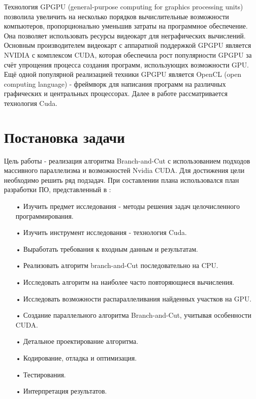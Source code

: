 \documentclass[a4paper,14pt,russian]{extreport}
\begin{document}
\par Технология GPGPU (general-purpose computing for graphics processing units) позволила увеличить на несколько порядков вычислительные возможности компьютеров, пропорционально уменьшив затраты на программное обеспечение. Она позволяет использовать ресурсы видеокарт для неграфических вычислений. Основным производителем видеокарт с аппаратной поддержкой GPGPU является NVIDIA с комплексом CUDA, которая обеспечила рост популярности GPGPU за счёт упрощения процесса создания программ, использующих возможности GPU. Ещё одной популярной реализацией техники GPGPU является OpenCL (open computing language) - фреймворк для написания программ на различных графических и центральных процессорах. Далее в работе рассматривается технология Cuda.


\section{Постановка задачи}

Цель работы - реализация алгоритма Branch-and-Cut с использованием подходов массивного параллелизма и возможностей Nvidia CUDA. Для достижения цели необходимо решить ряд подзадач. При составлении плана использовался план разработки ПО, представленный в \cite{mcconnell}: 
  \begin{itemize}
  \item[•] Изучить предмет исследования - методы решения задач целочисленного программирования.
  \item[•] Изучить инструмент исследования - технология Cuda.
  \item[•] Выработать требования к входным данным и результатам.
  \item[•] Реализовать алгоритм branch-and-Cut последовательно на CPU.
  \item[•] Исследовать алгоритм на наиболее часто повторяющиеся вычисления.
  \item[•] Исследовать возможности распараллеливания найденных участков на GPU.
  \item[•] Создание параллельного алгоритма Branch-and-Cut, учитывая особенности CUDA.
  \item[•] Детальное проектирование алгоритма.
  \item[•] Кодирование, отладка и оптимизация.
  \item[•] Тестирования.
  \item[•] Интерпретация результатов.
  \end{itemize}
\end{document}
